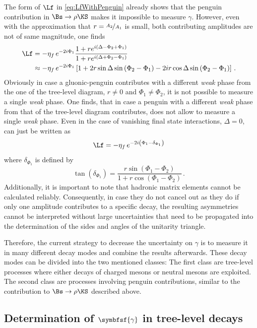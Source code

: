 The form of $\Lf$ in \cref{eq:LfWithPenguin} already shows that the penguin contribution in $\Bs\to\rho\KS$ makes it impossible to measure $\gamma$.
However, even with the approximation that $r=\nicefrac{A_2}{A_1}$ is small, \ie both contributing amplitudes are not of same magnitude, one finds
\begin{align}
\Lf&=-\eta_f\,e^{-2i\Phi_1}\frac{1+re^{i\left(\Delta-\Phi_2+\Phi_1\right)}}{1+re^{i\left(\Delta+\Phi_2-\Phi_1\right)}}\nonumber\\
&\approx-\eta_f\,e^{-2i\Phi_1}\left[1+2r\sin\Delta\sin\left(\Phi_2-\Phi_1\right)-2ir\cos\Delta\sin\left(\Phi_2-\Phi_1\right)\right]\,.
\end{align}
Obviously in case a gluonic-penguin contributes with a different \emph{weak} phase from the one of the tree-level diagram, \ie $r\neq0$ and $\Phi_1\neq\Phi_2$, it is not possible to measure a single \emph{weak} phase.
One finds, that in case a penguin with a different \emph{weak} phase from that of the tree-level diagram contributes, \Lf does not allow to measure a single \emph{weak} phase.
Even in the case of vanishing final state interactions, \ie $\Delta=0$, \Lf can just be written as
\begin{equation}
\Lf=-\eta_f\,e^{-2i\left(\Phi_1-\delta_{\Phi_1}\right)}
\end{equation}
where $\delta_{\Phi_1}$ is defined by
\begin{equation}
\tan\left(\delta_{\Phi_1}\right)=\frac{r\sin\left(\Phi_1-\Phi_2\right)}{1+r\cos\left(\Phi_1-\Phi_2\right)}\,.
\end{equation}
Additionally, it is important to note that hadronic matrix elements cannot be calculated reliably.
Consequently, in case they do not cancel out as they do if only one amplitude contributes to a specific decay, the resulting \CP asymmetries cannot be interpreted without large uncertainties that need to be propagated into the determination of the sides and angles of the unitarity triangle.

Therefore, the current strategy to decrease the uncertainty on $\gamma$ is to measure it in many different decay modes and combine the results afterwards.
These decay modes can be divided into the two mentioned classes: The first class are tree-level processes where either decays of charged \B mesons or neutral \B mesons are exploited.
The second class are processes involving penguin contributions, similar to the contribution to $\Bs\to\rho\KS$ described above.

\subsection[head={Determination of $\gamma$ in tree-level decays},tocentry={Determination of $\gamma$ in tree-level decays}]{Determination of $\symbfsf{\gamma}$ in tree-level decays}
\label{sec:gamamInTrees}

